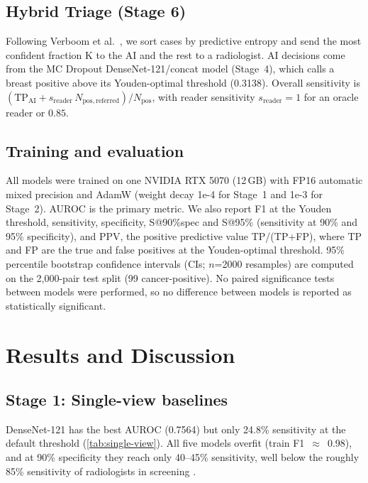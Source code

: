 \documentclass[conference]{IEEEtran}
\makeatletter
\newcommand{\satninety}{S@90\%spec}
\makeatother
\begin{document}
\subsection{Hybrid Triage (Stage 6)}

Following Verboom et al.\ \cite{12}, we sort cases by predictive entropy and send the most confident fraction K to the AI and the rest to a radiologist. AI decisions come from the MC Dropout DenseNet-121/concat model (Stage~4), which calls a breast positive above its Youden-optimal threshold (0.3138). Overall sensitivity is $(\mathrm{TP}_{\mathrm{AI}} + s_{\mathrm{reader}}\,N_{\mathrm{pos,referred}})/N_{\mathrm{pos}}$, with reader sensitivity $s_{\mathrm{reader}}=1$ for an oracle reader or $0.85$.

\subsection{Training and evaluation}\label{sec:eval}

All models were trained on one NVIDIA RTX 5070 (12\,GB) with FP16 automatic mixed precision and AdamW (weight decay 1e-4 for Stage~1 and 1e-3 for Stage~2). AUROC is the primary metric. We also report F1 at the Youden threshold, sensitivity, specificity, \satninety{} and S@95\% (sensitivity at 90\% and 95\% specificity), and PPV, the positive predictive value TP/(TP+FP), where TP and FP are the true and false positives at the Youden-optimal threshold. 95\% percentile bootstrap confidence intervals (CIs; $n$=2000 resamples) are computed on the 2,000-pair test split (99 cancer-positive). No paired significance tests between models were performed, so no difference between models is reported as statistically significant.

\section{Results and Discussion}

\subsection{Stage 1: Single-view baselines}

DenseNet-121 has the best AUROC (0.7564) but only 24.8\% sensitivity at the default threshold (\autoref{tab:single-view}). All five models overfit (train F1~$\approx$~0.98), and at 90\% specificity they reach only 40--45\% sensitivity, well below the roughly 85\% sensitivity of radiologists in screening \cite{17}.
\end{document}
